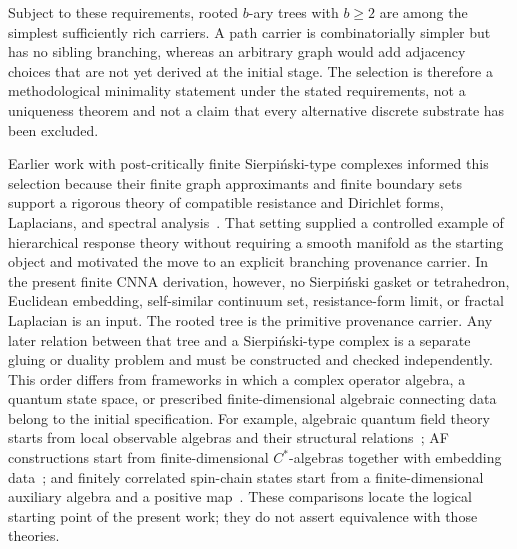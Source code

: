 \documentclass[11pt]{article}
\theoremstyle{remark}
\numberwithin{equation}{section}
\begin{document}
Subject to these requirements, rooted $b$-ary trees with $b\geq 2$ are among the simplest sufficiently rich carriers. A path carrier is combinatorially simpler but has no sibling branching, whereas an arbitrary graph would add adjacency choices that are not yet derived at the initial stage. The selection is therefore a methodological minimality statement under the stated requirements, not a uniqueness theorem and not a claim that every alternative discrete substrate has been excluded.

Earlier work with post-critically finite Sierpi\'nski-type complexes informed this selection because their finite graph approximants and finite boundary sets support a rigorous theory of compatible resistance and Dirichlet forms, Laplacians, and spectral analysis~\cite{Kigami1993,Kigami2001,Strichartz2006}. That setting supplied a controlled example of hierarchical response theory without requiring a smooth manifold as the starting object and motivated the move to an explicit branching provenance carrier. In the present finite CNNA derivation, however, no Sierpi\'nski gasket or tetrahedron, Euclidean embedding, self-similar continuum set, resistance-form limit, or fractal Laplacian is an input. The rooted tree is the primitive provenance carrier. Any later relation between that tree and a Sierpi\'nski-type complex is a separate gluing or duality problem and must be constructed and checked independently.
This order differs from frameworks in which a complex operator algebra, a quantum state space, or prescribed finite-dimensional algebraic connecting data belong to the initial specification. For example, algebraic quantum field theory starts from local observable algebras and their structural relations~\cite{HaagKastler1964}; AF constructions start from finite-dimensional $C^*$-algebras together with embedding data~\cite{Bratteli1972}; and finitely correlated spin-chain states start from a finite-dimensional auxiliary algebra and a positive map~\cite{FannesNachtergaeleWerner1992}. These comparisons locate the logical starting point of the present work; they do not assert equivalence with those theories.
\end{document}
